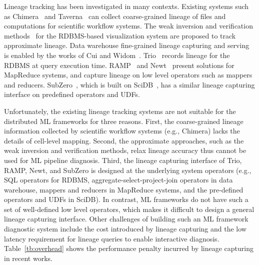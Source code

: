 \documentclass{sig-alternate}
\begin{document}
Lineage tracking has been investigated in many contexts.
Existing systems such as Chimera~\cite{foster02} and Taverna~\cite{oinn02} can collect coarse-grained lineage 
of files and computations for scientific workflow systems.
The weak inversion and verification methods~\cite{woodruff97} for the RDBMS-based visualization system 
are proposed to track approximate lineage.
Data warehouse fine-grained lineage capturing and serving is enabled by the works of Cui and Widom~\cite{cui00, cui03}.
Trio~\cite{widom04} records lineage for the RDBMS at query execution time.
RAMP~\cite{ikeda11, park11} and Newt~\cite{logothetis13} present
solutions for MapReduce systems, and capture lineage on low level operators such as mappers and reducers.
SubZero~\cite{wu13}, which is built on SciDB~\cite{brown10}, has a similar lineage capturing interface on predefined operators and UDFs.

Unfortunately, the existing lineage tracking systems are not suitable for the distributed ML frameworks for three reasons.
First, the coarse-grained lineage information collected by scientific workflow systems (e.g., Chimera) lacks the details of cell-level mapping.
Second, the approximate approaches, such as the weak inversion and verification methods, 
relax lineage accuracy thus cannot be used for ML pipeline diagnosis.
Third, the lineage capturing interface of Trio, RAMP, Newt, and SubZero is designed at
the underlying system operators (e.g., SQL operators for RDBMS, aggregate-select-project-join operators in data warehouse, 
mappers and reducers in MapReduce systems, and the pre-defined operators and UDFs in SciDB). 
In contrast, ML frameworks do not have such a set of well-defined low level operators,
which makes it difficult to design a general lineage capturing interface.
Other challenges of building such an ML framework diagnostic system include the cost introduced by 
lineage capturing and the low latency requirement for lineage queries to enable interactive diagnosis.
Table~\ref{tb:overhead} shows the performance penalty incurred by lineage capturing in recent works.
\end{document}
